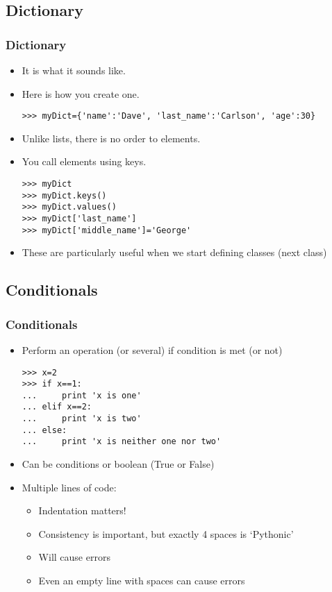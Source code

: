 \documentclass[xcolor=x11names,compress]{beamer}
\renewcommand{\(}{\begin{columns}}
\renewcommand{\)}{\end{columns}}
\newcommand{\<}[1]{\begin{column}{#1}}
\renewcommand{\>}{\end{column}}
\begin{document}
\subsection{Dictionary}
\begin{frame}[fragile]
  \frametitle{Dictionary}
  \begin{itemize}
  	\item It is what it sounds like. \pause
	\item Here is how you create one. \pause
\begin{verbatim}
>>> myDict={'name':'Dave', 'last_name':'Carlson', 'age':30}
\end{verbatim}
	\item Unlike lists, there is no order to elements. \pause
	\item You call elements using keys. \pause
\begin{verbatim}
>>> myDict
>>> myDict.keys()
>>> myDict.values()
>>> myDict['last_name']
>>> myDict['middle_name']='George'
\end{verbatim}
\pause
\item These are particularly useful when we start defining classes (next class)
  \end{itemize}
\end{frame}

\subsection{Conditionals}
\begin{frame}[fragile]
\frametitle{Conditionals}
\begin{itemize}
\item Perform an operation (or several) if condition is met (or not) \pause
\begin{verbatim}
>>> x=2
>>> if x==1:
...     print 'x is one'
... elif x==2:
...     print 'x is two'
... else:
...     print 'x is neither one nor two'
\end{verbatim}
\pause
\item Can be conditions or boolean (True or False) \pause
\item Multiple lines of code: \pause
\begin{itemize}
\item Indentation matters! \pause
\item Consistency is important, but exactly 4 spaces is `Pythonic' \pause
\item Will cause errors \pause
\item Even an empty line with spaces can cause errors
\end{itemize}
\end{itemize}
\end{frame}
\end{document}
